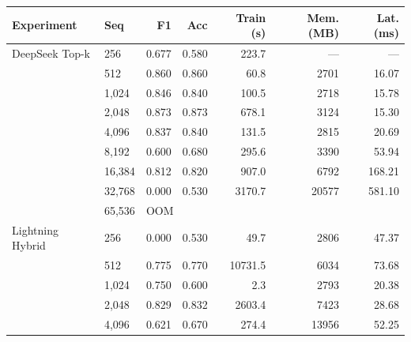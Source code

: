 \begingroup
\small
\setlength{\tabcolsep}{3pt}
\renewcommand{\addlinespace}[1][]{}
\newenvironment{appresultstable}{%
  \begin{center}
  \begin{tabular}{@{}>{\raggedright\arraybackslash}p{0.35\textwidth}lrrrrr@{}}
  \toprule
  Experiment & Seq & F1 & Acc & Train (s) & Mem. (MB) & Lat. (ms) \\
  \midrule
}{%
  \end{tabular}
  \end{center}
}
\captionsetup{hypcap=false}
\label{tab:app-imdb}
\begin{appresultstable}
  DeepSeek Top-k & 256 & 0.677 & 0.580 & 223.7 & --- & --- \\
   & 512 & 0.860 & 0.860 & 60.8 & 2701 & 16.07 \\
   & 1,024 & 0.846 & 0.840 & 100.5 & 2718 & 15.78 \\
   & 2,048 & 0.873 & 0.873 & 678.1 & 3124 & 15.30 \\
   & 4,096 & 0.837 & 0.840 & 131.5 & 2815 & 20.69 \\
   & 8,192 & 0.600 & 0.680 & 295.6 & 3390 & 53.94 \\
   & 16,384 & 0.812 & 0.820 & 907.0 & 6792 & 168.21 \\
   & 32,768 & 0.000 & 0.530 & 3170.7 & 20577 & 581.10 \\
   & 65,536 & \multicolumn{5}{l}{OOM} \\
  \addlinespace[4pt]
  Lightning Hybrid & 256 & 0.000 & 0.530 & 49.7 & 2806 & 47.37 \\
   & 512 & 0.775 & 0.770 & 10731.5 & 6034 & 73.68 \\
   & 1,024 & 0.750 & 0.600 & 2.3 & 2793 & 20.38 \\
   & 2,048 & 0.829 & 0.832 & 2603.4 & 7423 & 28.68 \\
   & 4,096 & 0.621 & 0.670 & 274.4 & 13956 & 52.25 \\
  \addlinespace[4pt]
\end{appresultstable}
\clearpage
